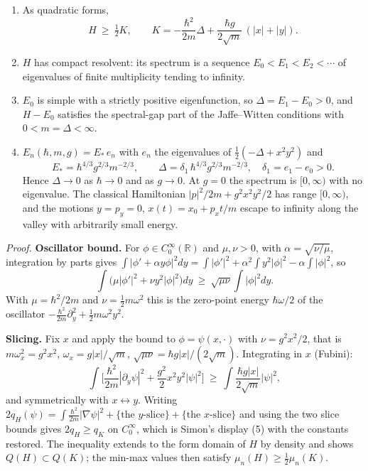\documentclass[11pt,a4paper]{article}
\newcommand{\tightlist}{\setlength{\itemsep}{0pt}\setlength{\parskip}{0pt}}
\begin{document}
\begin{enumerate}
\def\labelenumi{\arabic{enumi}.}
\tightlist
\item
  As quadratic forms, \[H\ \ge\ \tfrac12K,\qquad
  K=-\frac{\hbar^2}{2m}\Delta+\frac{\hbar g}{2\sqrt m}\,(|x|+|y|).\]
\item
  \(H\) has compact resolvent: its spectrum is a sequence
  \(E_0<E_1<E_2<\cdots\) of eigenvalues of finite multiplicity tending
  to infinity.
\item
  \(E_0\) is simple with a strictly positive eigenfunction, so
  \(\Delta=E_1-E_0>0\), and \(H-E_0\) satisfies the spectral-gap part of
  the Jaffe--Witten conditions with \(0<m=\Delta<\infty\).
\item
  \(E_n(\hbar,m,g)={E_*}\,e_n\) with \(e_n\) the eigenvalues of
  \(\tfrac12(-\Delta+x^2y^2)\) and
  \[{E_*}=\hbar^{4/3}g^{2/3}m^{-2/3},\qquad
  \Delta=\delta_1\,\hbar^{4/3}g^{2/3}m^{-2/3},\quad\delta_1=e_1-e_0>0.\]
  Hence \(\Delta\to0\) as \(\hbar\to0\) and as \(g\to0\). At \(g=0\) the
  spectrum is \([0,\infty)\) with no eigenvalue. The classical
  Hamiltonian \(|p|^2/2m+g^2x^2y^2/2\) has range \([0,\infty)\), and the
  motions \(y=p_y=0\), \(x(t)=x_0+p_xt/m\) escape to infinity along the
  valley with arbitrarily small energy.
\end{enumerate}

\emph{Proof.} \textbf{Oscillator bound.} For
\(\phi\in C_0^\infty(\mathbb R)\) and \(\mu,\nu>0\), with
\(\alpha=\sqrt{\nu/\mu}\), integration by parts gives
\(\int|\phi'+\alpha y\phi|^2dy=\int|\phi'|^2+\alpha^2\int y^2|\phi|^2 -\alpha\int|\phi|^2\),
so
\[\int\big(\mu|\phi'|^2+\nu y^2|\phi|^2\big)dy\ \ge\ \sqrt{\mu\nu}\int|\phi|^2dy .\]
With \(\mu=\hbar^2/2m\) and \(\nu=\tfrac12m\omega^2\) this is the
zero-point energy \(\hbar\omega/2\) of the oscillator
\(-\frac{\hbar^2}{2m}\partial_y^2 +\frac12m\omega^2y^2\).

\textbf{Slicing.} Fix \(x\) and apply the bound to
\(\phi=\psi(x,\cdot)\) with \(\nu=g^2x^2/2\), that is
\(m\omega_x^2=g^2x^2\), \(\omega_x=g|x|/\sqrt m\),
\(\sqrt{\mu\nu}=\hbar g|x|/(2\sqrt m)\). Integrating in \(x\) (Fubini):
\[\int\Big[\frac{\hbar^2}{2m}|\partial_y\psi|^2+\frac{g^2}{2}x^2y^2|\psi|^2\Big]
\ \ge\ \int\frac{\hbar g|x|}{2\sqrt m}|\psi|^2,\] and symmetrically with
\(x\leftrightarrow y\). Writing
\(2q_H(\psi)=\int\frac{\hbar^2}{2m}|\nabla\psi|^2+\{\text{the $y$-slice}\} +\{\text{the $x$-slice}\}\)
and using the two slice bounds gives \(2q_H\ge q_K\) on \(C_0^\infty\),
which is Simon's display (5) with the constants restored. The inequality
extends to the form domain of \(H\) by density and shows
\(Q(H)\subset Q(K)\); the min-max values then satisfy
\(\mu_n(H)\ge\tfrac12\mu_n(K)\).
\end{document}
